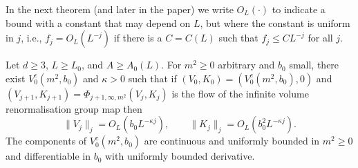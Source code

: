\documentclass[11pt]{amsart}
\numberwithin{equation}{section}
\numberwithin{theorem}{section}
\newcommand{\1}{{\bf 1}}
\newcommand{\OL}{O_L}
\begin{document}
In the next theorem (and later in the paper) we write $\OL(\cdot)$ to indicate
a bound with a constant that may depend on $L$, but where the constant
is uniform in $j$, i.e., $f_{j} = \OL (L^{-j})$ if there is a
$C=C(L)$ such that $f_{j}\leq C L^{-j}$ for all $j$.

\begin{theorem} \label{thm:flow} Let $d\geq 3$, $L\geq L_0$, and
  $A \geq A_0(L)$.  For $m^2 \geq 0$ arbitrary and $b_0$ small, there
  exist $V_0^c(m^{2},b_{0})$ 
  and $\kappa>0$ such that if
  $(V_0,K_0)=(V_0^c(m^2,b_0),0)$ and
  $(V_{j+1},K_{j+1})= \Phi_{j+1,\infty,m^{2}}(V_j,K_j)$ is the flow of
  the infinite volume renormalisation group map then
  \begin{equation} \label{e:flowVK}
    \|V_j\|_j = \OL(b_0L^{-\kappa j}),
    \qquad 
    \|K_j\|_j = \OL(b_0^2 L^{-\kappa j}).
  \end{equation}
  The components of
  $V_0^c(m^2,b_0)$ are continuous and uniformly bounded in $m^2 \geq 0$
  and differentiable in $b_0$ with uniformly bounded derivative.
\end{theorem}
\end{document}
